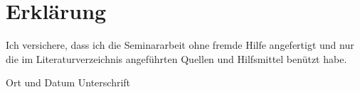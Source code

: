 \section*{Erklärung}

\vspace{0.2cm}

Ich versichere, dass ich die Seminararbeit ohne fremde Hilfe angefertigt und nur die im Literaturverzeichnis angeführten Quellen und Hilfsmittel benützt habe.

\vspace{1.8cm}

\noindent   \dotfill   \hspace{2.5cm}  \dotfill

\hspace{1.29cm}   Ort und Datum \hfill Unterschrift \hspace{2.15cm}
